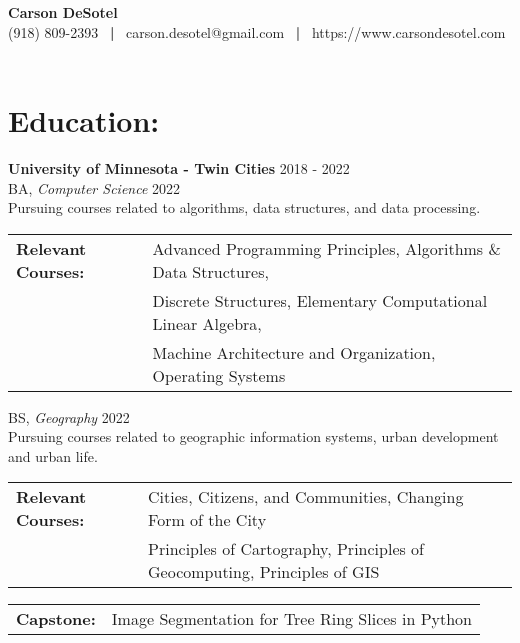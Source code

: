 \documentclass[10pt]{article}
\begin{document}
	\begin{center}
		{\LARGE \textbf{Carson DeSotel}} \\
		\vspace{5pt} 		%
		(918) 809-2393 \ \textbf{|} \
		carson.desotel@gmail.com \ \textbf{|} \
		https://www.carsondesotel.com \
		
	\end{center}
		
	\section*{Education: \hrulefill} 
		\textbf{University of Minnesota - Twin Cities} \hfill 2018 - 2022 \\
		\indent BA, \textit{Computer Science} \hfill 2022 \\
		\indent \indent Pursuing courses related to algorithms, data structures, and data processing. \\
		\indent \indent 
		\begin{tabular}{@{}l@{\ }l}
		\textbf{Relevant Courses: } & Advanced Programming Principles, Algorithms \& Data Structures, \\ & Discrete Structures, Elementary Computational Linear Algebra, \\ & Machine Architecture and Organization, Operating Systems \\
		\end{tabular}
		
		\vspace{5pt}
		
		\indent BS, \textit{Geography} \hfill 2022 \\
		\indent \indent Pursuing courses related to geographic information systems,  urban development and urban life. \\
		\indent \indent
		\begin{tabular}{@{}l@{\ }l}
		\textbf{Relevant Courses: } & Cities, Citizens, and Communities, Changing Form of the City \\ & Principles of Cartography, Principles of Geocomputing, Principles of GIS \\
		\end{tabular}
		
		\indent \indent
		\begin{tabular}{@{}l@{\ }l}
		\textbf{Capstone: } & Image Segmentation for Tree Ring Slices in Python\\
		\end{tabular}
		
\end{document}
